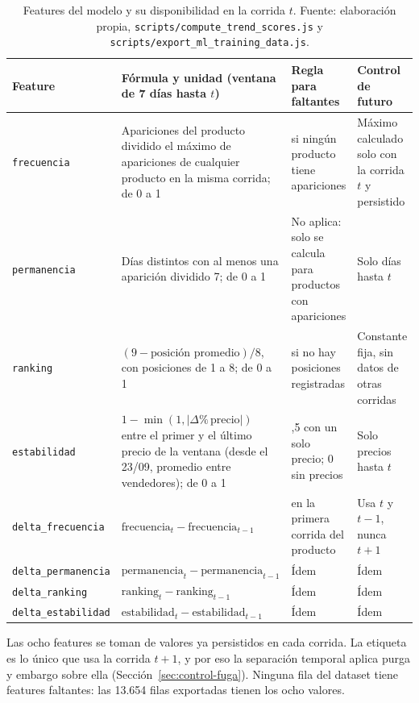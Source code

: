 \begin{table}[H]
	\centering
	\small
	\caption{Features del modelo y su disponibilidad en la corrida $t$. Fuente: elaboración propia, \texttt{scripts/compute\_trend\_scores.js} y \texttt{scripts/export\_ml\_training\_data.js}.}
	\label{tab:ml-features}
	\footnotesize
	\begin{tabularx}{\textwidth}{@{}>{\raggedright\arraybackslash}p{3.1cm} >{\raggedright\arraybackslash}X >{\raggedright\arraybackslash}p{2.4cm} >{\raggedright\arraybackslash}p{2.4cm}@{}}
		\toprule
		\textbf{Feature} & \textbf{Fórmula y unidad (ventana de 7 días hasta $t$)} & \textbf{Regla para faltantes} & \textbf{Control de futuro} \\
		\midrule
		\texttt{frecuencia} & Apariciones del producto dividido el máximo de apariciones de cualquier producto en la misma corrida; de 0 a 1 & 0 si ningún producto tiene apariciones & Máximo calculado solo con la corrida $t$ y persistido \\
		\texttt{permanencia} & Días distintos con al menos una aparición dividido 7; de 0 a 1 & No aplica: solo se calcula para productos con apariciones & Solo días hasta $t$ \\
		\texttt{ranking} & $(9 - \text{posición promedio})/8$, con posiciones de 1 a 8; de 0 a 1 & 0 si no hay posiciones registradas & Constante fija, sin datos de otras corridas \\
		\texttt{estabilidad} & $1 - \min(1, |\Delta\%\,\text{precio}|)$ entre el primer y el último precio de la ventana (desde el 23/09, promedio entre vendedores); de 0 a 1 & 0,5 con un solo precio; 0 sin precios & Solo precios hasta $t$ \\
		\texttt{delta\_frecuencia} & $\text{frecuencia}_t - \text{frecuencia}_{t-1}$ & 0 en la primera corrida del producto & Usa $t$ y $t-1$, nunca $t+1$ \\
		\texttt{delta\_permanencia} & $\text{permanencia}_t - \text{permanencia}_{t-1}$ & Ídem & Ídem \\
		\texttt{delta\_ranking} & $\text{ranking}_t - \text{ranking}_{t-1}$ & Ídem & Ídem \\
		\texttt{delta\_estabilidad} & $\text{estabilidad}_t - \text{estabilidad}_{t-1}$ & Ídem & Ídem \\
		\bottomrule
	\end{tabularx}
\end{table}

Las ocho features se toman de valores ya persistidos en cada corrida. La etiqueta es lo único que usa la corrida $t+1$, y por eso la separación temporal aplica purga y embargo sobre ella (Sección~\ref{sec:control-fuga}). Ninguna fila del dataset tiene features faltantes: las 13.654 filas exportadas tienen los ocho valores.

